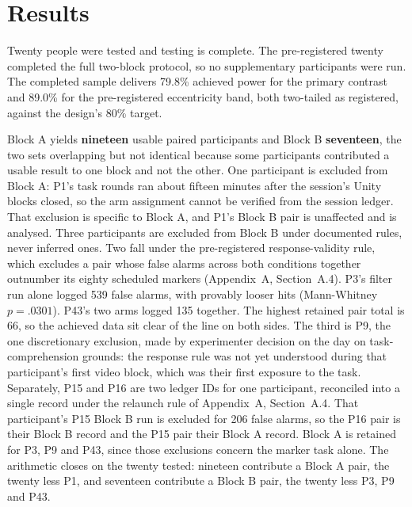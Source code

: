 \section{Results}

Twenty people were tested and testing is complete. The pre-registered twenty completed the
full two-block protocol, so no supplementary participants were run. The completed sample delivers 79.8\% achieved power for the primary contrast
and 89.0\% for the pre-registered eccentricity band, both two-tailed as registered, against the
design's 80\% target.

Block A yields \textbf{nineteen} usable paired participants and Block B \textbf{seventeen}, the two sets
overlapping but not identical because some participants contributed a usable result to one block and
not the other. One participant is excluded from Block A: P1's task rounds ran about fifteen minutes
after the session's Unity blocks closed, so the arm assignment cannot be verified from the session
ledger. That exclusion is specific to Block A, and P1's Block B pair is unaffected and is analysed.
Three participants are excluded from Block B under documented rules, never inferred ones. Two fall
under the pre-registered response-validity rule, which
excludes a pair whose false alarms across both conditions together outnumber its eighty scheduled
markers (Appendix~A, Section~A.4). P3's filter run alone logged 539 false alarms, with provably
looser hits (Mann-Whitney $p = .0301$). P43's two arms logged 135 together. The highest retained pair
total is 66, so the achieved data sit clear of the line on both sides. The third is P9, the one discretionary exclusion, made by experimenter decision on the day on
task-comprehension grounds: the response rule was not yet understood during that participant's first
video block, which was their first exposure to the task. Separately, P15 and P16 are two ledger
IDs for one participant, reconciled into a single record under the relaunch rule of Appendix~A,
Section~A.4. That participant's P15 Block B run is excluded for 206 false alarms, so the P16 pair is their Block B record and the P15 pair their Block A record.
Block A is retained for P3, P9 and P43, since those exclusions concern the marker task alone.
The arithmetic closes on the twenty tested: nineteen contribute a Block A pair, the twenty
less P1, and seventeen contribute a Block B pair, the twenty less P3, P9 and P43.

